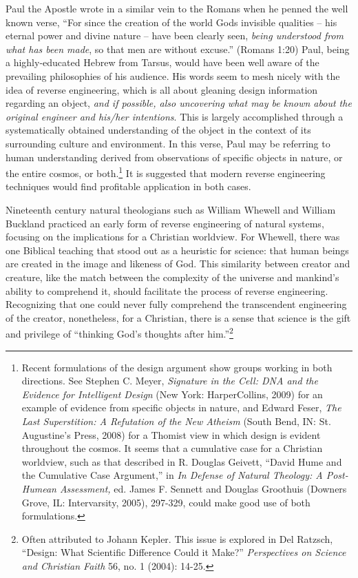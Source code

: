 Paul the Apostle wrote in a similar vein to the Romans when he penned
the well known verse, “For since the creation of the
world God{\textquotesingle}s invisible qualities – his eternal power
and divine nature – have been clearly seen,
\textit{being understood from what has been
made}, so that men are without
excuse.” (Romans 1:20)
Paul, being a highly-educated Hebrew from Tarsus, would have been well
aware of the prevailing philosophies of his audience. His words seem to
mesh nicely with the idea of reverse engineering, which is all about
gleaning design information regarding an object,
\textit{and if possible, also uncovering what may be
known about the original engineer and his/her
intentions}. This is largely accomplished through a
systematically obtained understanding of the object in the context of
its surrounding culture and environment. In this verse, Paul may be
referring to human understanding derived from observations of specific
objects in nature, or the entire cosmos, or
both.\footnote{
Recent formulations of the design argument show
groups working in both directions. See Stephen C. Meyer,
\textit{Signature in the Cell: DNA and the Evidence for Intelligent
Design} (New York: HarperCollins, 2009) for an example of evidence from
specific objects in nature, and Edward Feser, \textit{The Last
Superstition: A Refutation of the New Atheism} (South Bend, IN: St.
Augustine’s Press, 2008) for a Thomist view in which design is evident
throughout the cosmos. It seems that a cumulative case for a Christian
worldview, such as that described in R. Douglas Geivett, “David Hume
and the Cumulative Case Argument,” in \textit{In Defense of Natural
Theology: A Post-Humean Assessment,} ed. James F. Sennett and Douglas
Groothuis (Downers Grove, IL: Intervarsity, 2005), 297-329, could make
good use of both formulations.
}
It is
suggested that modern reverse engineering techniques would find
profitable application in both cases.


Nineteenth century natural theologians such as William Whewell and
William Buckland practiced an early form of reverse engineering of
natural systems, focusing on the implications for a Christian
worldview. For Whewell, there was one Biblical teaching that stood out
as a heuristic for science: that human beings are created in the image
and likeness of God.\citep[][pg. 283]{fuller2006} This similarity between
creator and creature, like the match between the complexity of the
universe and mankind’s ability to comprehend it, should facilitate the
process of reverse engineering. Recognizing that one could never fully
comprehend the transcendent engineering of the creator, nonetheless,
for a Christian, there is a sense that science is the gift and
privilege of “thinking God’s thoughts after him.”\footnote{
Often attributed to Johann Kepler. This issue is
explored in Del Ratzsch, “Design: What Scientific Difference Could it
Make?” \textit{Perspectives on Science and Christian Faith }56, no. 1
(2004): 14-25.
}

